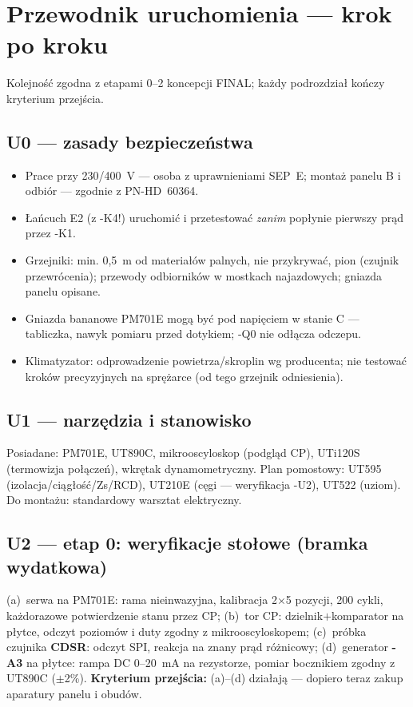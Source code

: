\documentclass[11pt,a4paper]{article}
\newcommand{\krok}[1]{\textbf{\color{granat}Kryterium przejścia:} #1}
\begin{document}
\section{Przewodnik uruchomienia --- krok po kroku}
Kolejność zgodna z etapami 0--2 koncepcji FINAL; każdy podrozdział kończy kryterium przejścia.

\subsection{U0 --- zasady bezpieczeństwa}
\begin{itemize}
\item Prace przy 230/400~V --- osoba z uprawnieniami SEP~E; montaż panelu B i odbiór ---
zgodnie z PN-HD~60364.
\item Łańcuch E2 (z -K4!) uruchomić i przetestować \emph{zanim} popłynie pierwszy prąd przez -K1.
\item Grzejniki: min. 0,5~m od materiałów palnych, nie przykrywać, pion (czujnik przewrócenia);
przewody odbiorników w mostkach najazdowych; gniazda panelu opisane.
\item Gniazda bananowe PM701E mogą być pod napięciem w stanie C --- tabliczka, nawyk pomiaru
przed dotykiem; -Q0 nie odłącza odczepu.
\item Klimatyzator: odprowadzenie powietrza/skroplin wg producenta; nie testować kroków
precyzyjnych na sprężarce (od tego grzejnik odniesienia).
\end{itemize}

\subsection{U1 --- narzędzia i stanowisko}
Posiadane: PM701E, UT890C, mikrooscyloskop (podgląd CP), UTi120S (termowizja połączeń), wkrętak
dynamometryczny. Plan pomostowy: UT595 (izolacja/ciągłość/Zs/RCD), UT210E (cęgi --- weryfikacja
-U2), UT522 (uziom). Do montażu: standardowy warsztat elektryczny.

\subsection{U2 --- etap 0: weryfikacje stołowe (bramka wydatkowa)}
(a)~serwa na PM701E: rama nieinwazyjna, kalibracja 2$\times$5 pozycji, 200 cykli, każdorazowe
potwierdzenie stanu przez CP; (b)~tor CP: dzielnik$+$komparator na płytce, odczyt poziomów i duty
zgodny z mikrooscyloskopem; (c)~próbka czujnika \textbf{CDSR}: odczyt SPI, reakcja na znany prąd
różnicowy; (d)~generator \textbf{-A3} na płytce: rampa DC 0--20~mA na rezystorze, pomiar bocznikiem
zgodny z UT890C ($\pm$2\%). \krok{(a)--(d) działają --- dopiero teraz zakup aparatury panelu
i obudów.}
\end{document}

